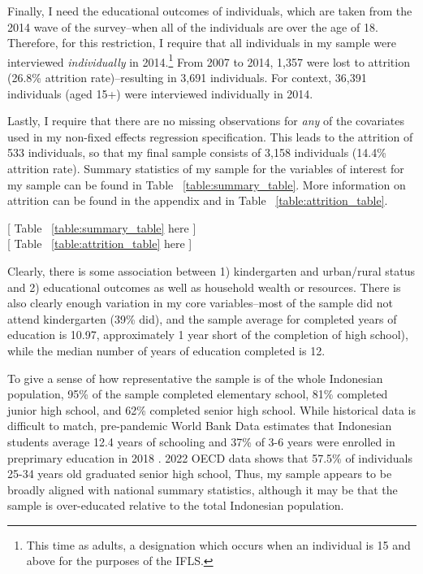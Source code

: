 Finally, I need the educational outcomes of individuals, which are taken from the 2014 wave of the survey--when all of the individuals are over the age of 18. Therefore, for this restriction, I require that all individuals in my sample were interviewed \textit{individually} in 2014.\footnote{ This time as adults, a designation which occurs when an individual is 15 and above for the purposes of the IFLS.} From 2007 to 2014, 1,357 were lost to attrition (26.8\% attrition rate)--resulting in 3,691 individuals. For context, 36,391 individuals (aged 15+) were interviewed individually in 2014.

Lastly, I require that there are no missing observations for \textit{any} of the covariates used in my non-fixed effects regression specification. This leads to the attrition of 533 individuals, so that my final sample consists of 3,158 individuals (14.4\% attrition rate). Summary statistics of my sample for the variables of interest for my sample can be found in Table ~\ref{table:summary_table}. More information on attrition can be found in the appendix and in Table ~\ref{table:attrition_table}.
\begin{center}
	[ Table ~\ref{table:summary_table} here ] \\
\vspace{-0.1in}
	[ Table ~\ref{table:attrition_table} here ]
\end{center}
Clearly, there is some association between 1) kindergarten and urban/rural status and 2) educational outcomes as well as household wealth or resources. There is also clearly enough variation in my core variables--most of the sample did not attend kindergarten (39\% did), and the sample average for completed years of education is 10.97, approximately 1 year short of the completion of high school), while the median number of years of education completed is 12. 

To give a sense of how representative the sample is of the whole Indonesian population, 95\% of the sample completed elementary school, 81\% completed junior high school, and 62\% completed senior high school. While historical data is difficult to match, pre-pandemic World Bank Data estimates that Indonesian students average 12.4 years of schooling and 37\% of 3-6 years were enrolled in preprimary education in 2018 \citep{Afkar2020}. 2022 OECD data shows that 57.5\% of individuals 25-34 years old graduated senior high school, Thus, my sample appears to be broadly aligned with national summary statistics, although it may be that the sample is over-educated relative to the total Indonesian population.